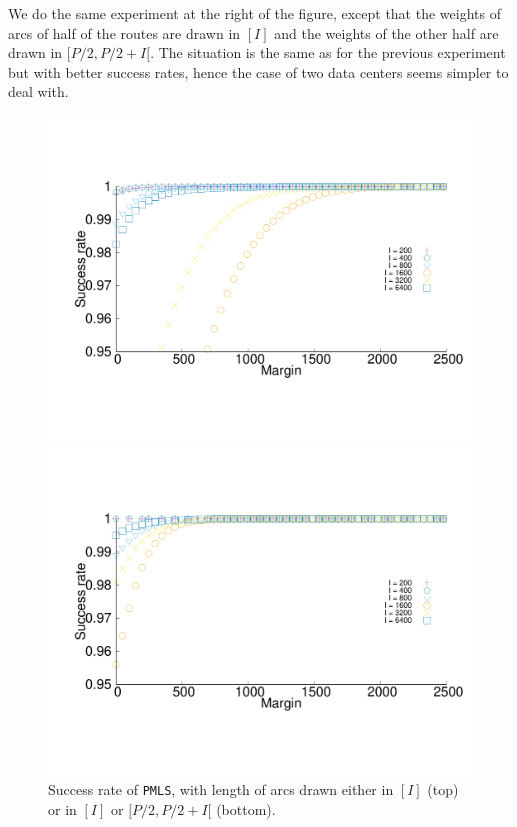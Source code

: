 \documentclass[a4paper,10pt]{journal}
\newcommand\PMLS{\texttt{PMLS}\xspace}
\begin{document}
 	 We do the same experiment at the right of the figure, except that the weights of arcs of half of the routes are drawn in $[I]$ and the weights of the other half are drawn in $[P/2,P/2 + I[$. The situation is the same as for the previous experiment but with better success rates, hence the case of two data centers seems simpler to deal with.
  
           \begin{figure}
    
       \begin{center}
      \includegraphics[width = 0.9\linewidth]{departs_distrib1Grp.pdf}
     
     
     
         
      \includegraphics[width = 0.9\linewidth]{departs_distrib2Grp.pdf}
   
  
         \end{center}
         \caption{Success rate of \PMLS, with length of arcs drawn either in $[I]$ (top) or in $[I]$ or $[P/2,P/2 + I[$ (bottom).}
      \label{fig:2grp} 
  \end{figure}
\end{document}
